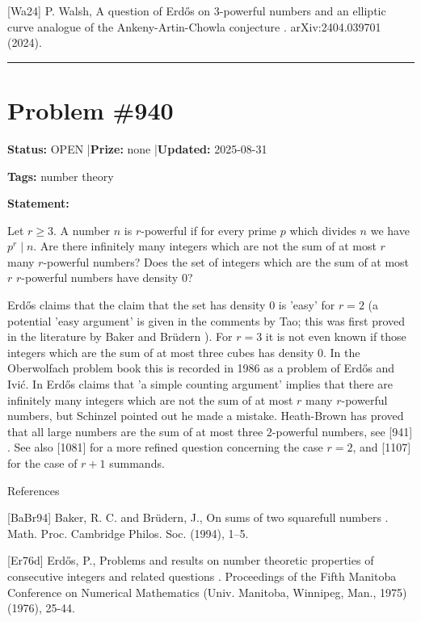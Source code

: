 \documentclass{article}
\begin{document}
[Wa24] P. Walsh, A question of Erd\H{o}s on 3-powerful numbers and an elliptic curve analogue of the Ankeny-Artin-Chowla conjecture . arXiv:2404.039701 (2024).

\noindent\rule{\linewidth}{0.4pt}


\section{Problem \#940}
\label{prob:940}

\noindent\textbf{Status:} OPEN \quad|\quad \textbf{Prize:} none \quad|\quad \textbf{Updated:} 2025-08-31

\noindent\textbf{Tags:} number theory

\medskip

\noindent\textbf{Statement:}

Let $r\geq 3$. A number $n$ is $r$-powerful if for every prime $p$ which divides $n$ we have $p^r\mid n$. Are there infinitely many integers which are not the sum of at most $r$ many $r$-powerful numbers? Does the set of integers which are the sum of at most $r$ $r$-powerful numbers have density $0$?




Erd\H{o}s \cite{Er76d} claims that the claim that the set has density $0$ is 'easy' for $r=2$ (a potential 'easy argument' is given in the comments by Tao; this was first proved in the literature by Baker and Br\"{u}dern \cite{BaBr94}). For $r=3$ it is not even known if those integers which are the sum of at most three cubes has density $0$. In the Oberwolfach problem book this is recorded in 1986 as a problem of Erd\H{o}s and Ivi\'{c}. In \cite{Er76d} Erd\H{o}s claims that 'a simple counting argument' implies that there are infinitely many integers which are not the sum of at most $r$ many $r$-powerful numbers, but Schinzel pointed out he made a mistake. Heath-Brown \cite{He88} has proved that all large numbers are the sum of at most three $2$-powerful numbers, see [941] . See also [1081] for a more refined question concerning the case $r=2$, and [1107] for the case of $r+1$ summands.




References

[BaBr94] Baker, R. C. and Br\"udern, J., On sums of two squarefull numbers . Math. Proc. Cambridge Philos. Soc. (1994), 1--5.

[Er76d] Erd\H{o}s, P., Problems and results on number theoretic properties of consecutive integers and related questions . Proceedings of the Fifth Manitoba Conference on Numerical Mathematics (Univ. Manitoba, Winnipeg, Man., 1975) (1976), 25-44.
\end{document}
